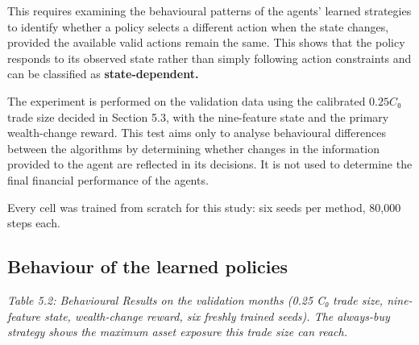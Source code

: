 This requires examining the behavioural patterns of the agents' learned
strategies to identify whether a policy selects a different action when
the state changes, provided the available valid actions remain the same.
This shows that the policy responds to its observed state rather than
simply following action constraints and can be classified as
\textbf{state-dependent.}

The experiment is performed on the validation data using the calibrated
\(0.25C₀\) trade size decided in Section 5.3, with the nine-feature
state and the primary wealth-change reward. This test aims only to
analyse behavioural differences between the algorithms by determining
whether changes in the information provided to the agent are reflected
in its decisions. It is not used to determine the final financial
performance of the agents.

Every cell was trained from scratch for this study: six seeds per
method, 80,000 steps each.

\subsection{Behaviour of the learned policies}

\emph{Table 5.2: Behavioural Results on the validation months (0.25 C₀
trade size, nine-feature state, wealth-change reward, six freshly
trained seeds). The always-buy strategy shows the maximum asset exposure
this trade size can reach.}

